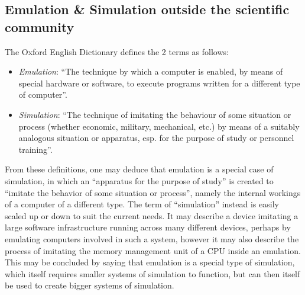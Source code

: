 \subsection{Emulation \& Simulation outside the scientific community}
The Oxford English Dictionary defines the 2 terms as follows:
\begin{itemize}
    \item \emph{Emulation}: \enquote{The technique by which a
    computer is enabled, by means of special
    hardware or software, to execute programs
    written for a different type of computer}\cite[p. 196]{emulation_oxford}.
    \item \emph{Simulation}: \enquote{The technique of imitating the behaviour of
    some situation or process (whether economic,
    military, mechanical, etc.) by means of a
    suitably analogous situation or apparatus, esp.
    for the purpose of study or personnel training}\cite[p.503]{simulation_oxford}.
\end{itemize}
From these definitions, one may deduce that emulation is a special case of simulation,
in which an \enquote{apparatus for the purpose of study} is created to \enquote{imitate the behavior of some situation or process},
namely the internal workings of a computer of a different type.
The term of \enquote{simulation} instead is easily scaled up or down to suit the current needs.
It may describe a device imitating a large software infrastructure running across many different devices,
perhaps by emulating computers involved in such a system,
however it may also describe the process of imitating the memory management unit of a CPU inside an emulation.
This may be concluded by saying that emulation is a special type of simulation,
which itself requires smaller systems of simulation to function,
but can then itself be used to create bigger systems of simulation.

